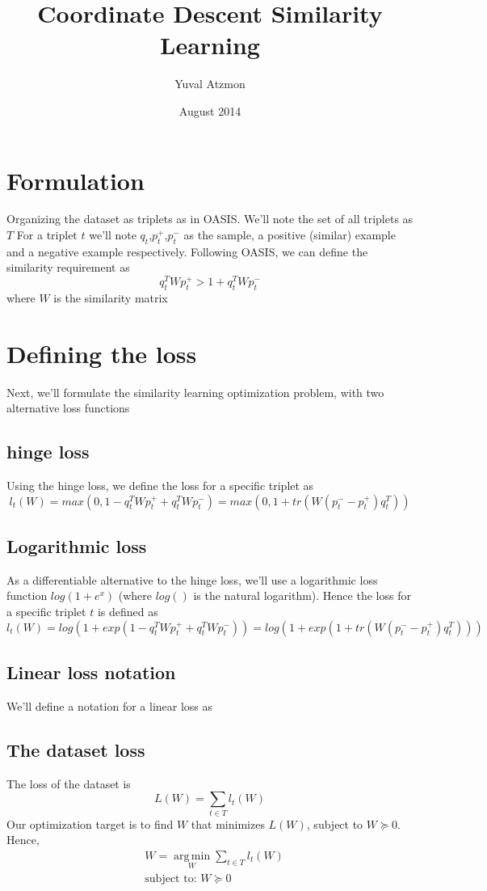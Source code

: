\documentclass{article}
\title{Coordinate Descent Similarity Learning}
\author{Yuval Atzmon}
\date{August 2014}
\DeclareMathOperator*{\argmin}{arg\,min}
\begin{document}
\maketitle

\section{Formulation}
Organizing the dataset as triplets as in OASIS. We’ll note the set of all triplets as $T$ 
For a triplet $t$ we’ll note $q_t$,$p_t^+$,$p_t^-$  as the sample, a positive (similar) example and a negative example respectively. Following OASIS, we can define the similarity requirement as
\begin{equation}
q_t^T Wp_t^+>1+q_t^T Wp_t^-
\end{equation}
where $W$ is the similarity matrix
\section{Defining the loss }
Next, we’ll formulate the similarity learning optimization problem, with two alternative loss functions
\subsection{hinge loss} 
Using the hinge loss, we define the loss for a specific triplet as
\begin{equation}
l_t (W)=max(0,1-q_t^T Wp_t^++q_t^T Wp_t^-)=max(0,1+tr(W(p_t^--p_t^+)q_t^T))
\end{equation}
	
\subsection{Logarithmic loss} 
As a differentiable alternative to the hinge loss, we’ll use a logarithmic loss function  $log(1+e^x)$ (where $log()$ is the natural logarithm). Hence the loss for a specific triplet $t$ is defined as 
\begin{equation}
l_t (W)=log(1+exp(1-q_t^T Wp_t^++q_t^T Wp_t^-))=log(1+exp(1+tr(W(p_t^--p_t^+)q_t^T)))
\end{equation}
\subsection{Linear loss notation} 
We’ll define a notation for  a linear loss as 

\subsection{The dataset loss} 
The loss of the dataset is
\begin{equation}
L(W)=\sum\limits_{t\in T}{l_t (W)}
\end{equation}
Our optimization target is to find $W$ that minimizes $L(W)$, subject to $W\succeq 0$. Hence,
\begin{equation}
\begin{aligned}
& W=\argmin\limits_{W}{\sum\limits_{t\in T}{l_t (W)}}  \\ & \text{subject to: } W\succeq 0
\end{aligned}
\end{equation}
\end{document}
